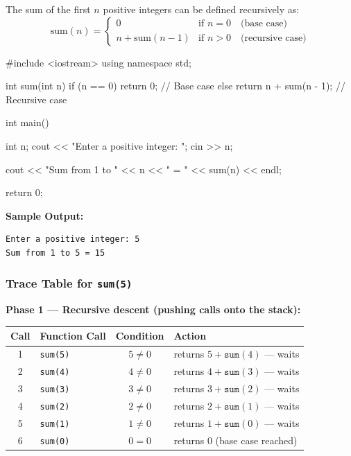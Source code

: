 The sum of the first $n$ positive integers can be defined recursively as:
\[
    \text{sum}(n) =
    \begin{cases}
        0 & \text{if } n = 0 \quad \text{(base case)} \\
        n + \text{sum}(n - 1) & \text{if } n > 0
            \quad \text{(recursive case)}
    \end{cases}
\]

\begin{cppcode}
#include <iostream>
using namespace std;

int sum(int n)
{
    if (n == 0)
        return 0;           // Base case
    else
        return n + sum(n - 1);  // Recursive case
}

int main()
{
    int n;
    cout << "Enter a positive integer: ";
    cin >> n;

    cout << "Sum from 1 to " << n
         << " = " << sum(n) << endl;

    return 0;
}
\end{cppcode}

\noindent\textbf{Sample Output:}
\begin{verbatim}
Enter a positive integer: 5
Sum from 1 to 5 = 15
\end{verbatim}

\subsubsection{Trace Table for \texttt{sum(5)}}

\noindent\textbf{Phase 1 --- Recursive descent (pushing calls onto the stack):}

\begin{center}
\renewcommand{\arraystretch}{1.3}
\begin{tabular}{@{}clcl@{}}
\toprule
\textbf{Call} & \textbf{Function Call}
    & \textbf{Condition}
    & \textbf{Action} \\
\midrule
1 & \texttt{sum(5)} & $5 \neq 0$
    & returns $5 + \texttt{sum}(4)$ --- waits \\
2 & \texttt{sum(4)} & $4 \neq 0$
    & returns $4 + \texttt{sum}(3)$ --- waits \\
3 & \texttt{sum(3)} & $3 \neq 0$
    & returns $3 + \texttt{sum}(2)$ --- waits \\
4 & \texttt{sum(2)} & $2 \neq 0$
    & returns $2 + \texttt{sum}(1)$ --- waits \\
5 & \texttt{sum(1)} & $1 \neq 0$
    & returns $1 + \texttt{sum}(0)$ --- waits \\
6 & \texttt{sum(0)} & $0 = 0$
    & returns $0$ \quad (base case reached) \\
\bottomrule
\end{tabular}
\end{center}

